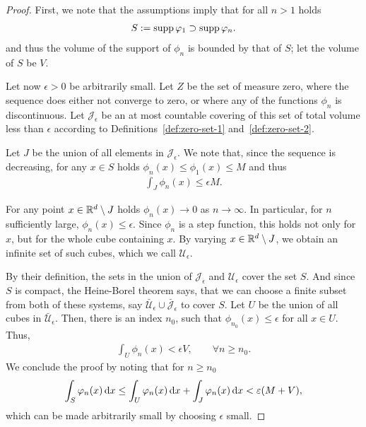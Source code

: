\begin{proof}
  First, we note that the assumptions imply that for all $n>1$ holds
  \begin{gather*}
    S:= \operatorname{supp} \varphi_1 \supset \operatorname{supp} \varphi_n.
  \end{gather*}
  and thus the volume of the support of $\phi_n$ is bounded by that of
  $S$; let the volume of $S$ be $V$.

  Let now $\epsilon>0$ be arbitrarily small. Let $Z$ be the set of
  measure zero, where the sequence does either not converge to zero,
  or where any of the functions $\phi_n$ is discontinuous. Let
  $\mathcal J_\epsilon$ be an at most countable covering of this set
  of total volume less than $\epsilon$ according to
  Definitions~\ref{def:zero-set-1} and~\ref{def:zero-set-2}.

  Let $J$ be the union of all elements in $\mathcal J_\epsilon$. We
  note that, since the sequence is decreasing, for any $x\in S$ holds
  $\phi_n(x) \le \phi_1(x) \le M$ and thus
  \begin{gather*}
    \int_J \phi_n(x) \le \epsilon M.
  \end{gather*}
  
  For any point $x\in \mathbb R^d\setminus J$ holds $\phi_n(x)\to 0$ as
  $n\to\infty$. In particular, for $n$ sufficiently large, $\phi_n(x)
  \le \epsilon$. Since $\phi_n$ is a step function, this holds not
  only for $x$, but for the whole cube containing $x$. By varying
  $x\in \mathbb R^d\setminus J$, we obtain an infinite set of such cubes,
  which we call $\mathcal U_\epsilon$.
  
  By their definition, the sets in the union of $\mathcal J_\epsilon$
  and $\mathcal U_\epsilon$ cover the set $S$. And since $S$ is
  compact, the Heine-Borel theorem says, that we can choose a finite
  subset from both of these systems, say $\breve{\mathcal U_\epsilon}
  \cup \breve{\mathcal J_\epsilon}$ to cover $S$. Let $U$ be the union
  of all cubes in $\breve{\mathcal U_\epsilon}$. Then, there is an
  index $n_0$, such that $\phi_{n_0}(x) \le \epsilon$ for all $x\in
  U$. Thus,
  \begin{gather*}
    \int_{U} \phi_n(x) < \epsilon V,
    \qquad \forall n\ge n_0.
  \end{gather*}
  We conclude the proof by noting that for $n\ge n_0$
  \begin{gather*}
    \int_{S} \varphi_n(x)\,\mathrm{d} x
    \le \int_{U} \varphi_n(x)\,\mathrm{d} x + \int_{J} \varphi_n(x)\,\mathrm{d} x
    < \varepsilon(M+V),
  \end{gather*}
  which can be made arbitrarily small by choosing $\epsilon$ small.
\end{proof}

